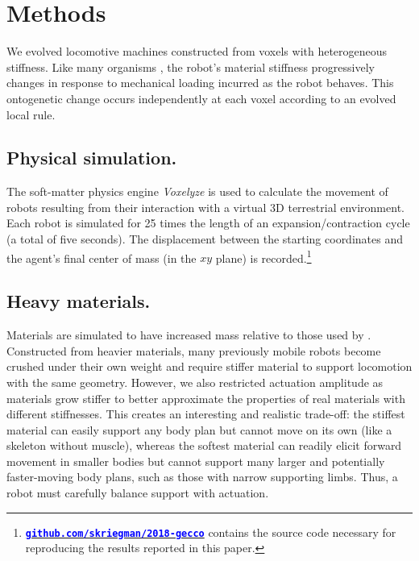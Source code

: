 \section{Methods}
\label{sec:methods}

We evolved locomotive machines constructed from voxels with heterogeneous stiffness. 
Like many organisms \citep{ruff2006s}, the robot's material stiffness progressively changes in response to mechanical loading incurred as the robot behaves.
This ontogenetic change occurs independently at each voxel according to an evolved local rule.


\subsection{Physical simulation.}

The soft-matter physics engine \textit{Voxelyze} \citep{hiller2014dynamic} is used to calculate the movement of robots resulting from their interaction with a virtual 3D terrestrial environment.
Each robot is simulated for 25 times the length of an expansion/contraction cycle (a total of five seconds). 
The displacement between the starting coordinates and the agent's final center of mass (in the $xy$ plane) is recorded.\footnote{\href{https://github.com/skriegman/2018-gecco}{\textcolor{blue}{\textbf{\texttt{github.com/skriegman/2018-gecco}}}} contains the source code necessary for reproducing the results reported in this paper.}




\subsection{Heavy materials.}


Materials are simulated to have increased mass relative to those used by \cite{hiller2012automatic,cheney2013unshackling,cheney2014electro}.
Constructed from heavier materials, many previously mobile robots become crushed under their own weight and require stiffer material to support locomotion with the same geometry.
However, we also restricted actuation amplitude as materials grow stiffer to better approximate the properties of real materials with different stiffnesses.
This creates an interesting and realistic trade-off: the stiffest material can easily support any body plan but cannot move on its own (like a skeleton without muscle), whereas the softest material can readily elicit forward movement in smaller bodies but cannot support many larger and potentially faster-moving body plans, 
such as those with narrow supporting limbs.
Thus, a robot must carefully balance support with actuation.



